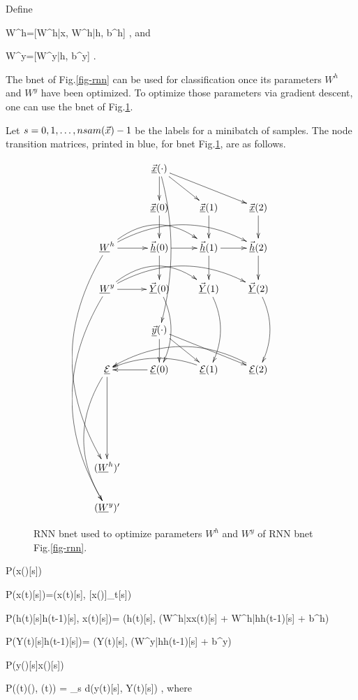 Define

\beq
W^h=[W^{h|x}, W^{h|h}, b^h]
\;,
\eeq
and

\beq
W^y=[W^{y|h}, b^y]
\;.
\eeq

The bnet of Fig.\ref{fig-rnn}
can be used for
classification once 
its parameters 
$W^h$ and $W^y$
have been optimized.
To optimize
those parameters via gradient
descent,
one can use the bnet 
of Fig.\ref{fig-rnn-ext}.

Let $s=0,1, \ldots, nsam({\vec{x}})-1$
be the labels for a minibatch of samples.
The node transition matrices,
 printed in blue,
for bnet Fig.\ref{fig-rnn-ext},
 are as follows.



\begin{figure}[h!]
\centering
$$\xymatrix{
&\ranvec{x}(\cdot)\ar[d]\ar[dr]\ar[drr]
\ar@/^1pc/[dddd]
\\
&\vec{\rvx}(0)\ar[d]&
\vec{\rvx}(1)\ar[d]&
\vec{\rvx}(2)\ar[d]\\
\rvW^h\ar[r]\ar@/^2pc/[rr]\ar@/^2pc/[rrr]
\ar@/_3pc/[dddddd]
&\vec{\rvh}(0)\ar[d]\ar[r]&
\vec{\rvh}(1)\ar[d]\ar[r]&
\vec{\rvh}(2)\ar[d]\\
\rvW^y\ar[r]\ar@/^2pc/[rr]\ar@/^2pc/[rrr]
\ar@/_3pc/[dddddd]
&\vec{\rvY}(0)\ar@/^1pc/[dd]&
\vec{\rvY}(1)\ar@/^1pc/[dd]&
\vec{\rvY}(2)\ar@/^1pc/[dd]
\\
&
\ranvec{y}(\cdot)\ar[d]\ar[dr]\ar[drr]
\\
\ul{\cale}\ar[ddd]
\ar@/_2pc/[dddd]&
\ul{\cale}(0)\ar[l]&
\ul{\cale}(1)\ar@/_1pc/[ll]&
\ul{\cale}(2)\ar@/_2pc/[lll]
\\
\\
\\
(\rvW^h)'\\
(\rvW^y)'
}
$$
\caption{RNN bnet used
to optimize parameters $W^h$
and $W^y$ of RNN bnet Fig.\ref{fig-rnn}.}
\label{fig-rnn-ext}
\end{figure}

\beq\color{blue}
P(x(\cdot)[s])
\eeq

\beq\color{blue}
P(x(t)[s])=\delta(x(t)[s], 
[x(\cdot)]_t[s])
\eeq

\beq\color{blue}
P(h(t)[s]\cond h(t-1)[s], x(t)[s])=
\delta(h(t)[s],
\cala(W^{h|x}x(t)[s] + W^{h|h}h(t-1)[s] + b^h)
\eeq

\beq\color{blue}
P(Y(t)[s]\cond h(t-1)[s])=
\delta(Y(t)[s],
\cala(W^{y|h}h(t-1)[s] + b^y)
\eeq

\beq\color{blue}
P(y(\cdot)[s]\cond x(\cdot)[s])
\eeq

\beq\color{blue}
P(\cale(t)\cond \vecy(\cdot), (t))
=
\sum_s d(y(t)[s], Y(t)[s])
\;,
\eeq
where 

